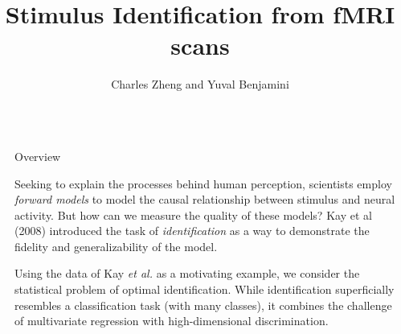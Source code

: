 \documentclass[final]{beamer}
\title{Stimulus Identification from fMRI scans}
\author{Charles Zheng and Yuval Benjamini} %
\institute{Stanford University, Department of Statistics} %
\newlength{\sepwid}
\newlength{\onecolwid}
\begin{document}

\setlength{\belowcaptionskip}{2ex} %
\setlength\belowdisplayshortskip{2ex} %

\begin{frame}[t] %

\begin{columns}[t] %

\begin{column}{\sepwid}\end{column} %

\begin{column}{\onecolwid} %



\begin{alertblock}{Overview}
\vspace{0.3in}

Seeking to explain the processes behind human perception, scientists
employ \emph{forward models} to model the causal relationship between
stimulus and neural activity.  But how can we measure the quality of
these models?  Kay et al (2008) introduced the
task of \emph{identification} as a way to demonstrate the fidelity and
generalizability of the model.
\vspace{0.7in}

Using the data of Kay \emph{et al.} as a motivating example, we
consider the statistical problem of optimal identification.  While
identification superficially resembles a classification task (with
many classes), it combines the challenge of multivariate regression
with high-dimensional discrimination.
\end{alertblock}


\end{column}
\end{columns}
\end{frame}
\end{document}
